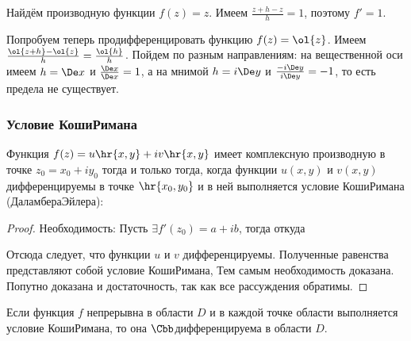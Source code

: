 \documentclass[a4paper]{article}
\begin{document}
\begin{ex}
Найдём производную функции $f(z) = z$. Имеем $\frac{z + h - z}{h} = 1$, поэтому $f' = 1$.
\end{ex}

\begin{ex}
Попробуем теперь продифференцировать функцию $f(z) = \ol{z}$.
Имеем $\frac{\ol{z + h} - \ol{z}}{h} = \frac{\ol{h}}{h}$. Пойдем по разным направлениям:
на вещественной оси имеем $h = \De x$ и $\frac{\De x}{\De x} = 1$, а на мнимой
$h = i\De y$ и $\frac{ - i\De y}{i\De y} = - 1$, то есть предела не существует.
\end{ex}

\subsubsection{Условие Коши\ч Римана}

\begin{theorem}
Функция $f(z) = u\hr{x,y} + iv\hr{x,y}$ имеет комплексную производную в точке $z_0 = x_0 + iy_0$ тогда
и только тогда, когда функции $u(x,y)$ и $v(x,y)$ дифференцируемы в точке $\hr{x_0, y_0}$ и в ней выполняется условие
Коши\ч Римана (Даламбера\ч Эйлера):

\end{theorem}

\begin{proof}
Необходимость: Пусть $\exi f'(z_0 ) = a + i b$, тогда
откуда

Отсюда следует, что функции $u$ и $v$ дифференцируемы. Полученные равенства представляют собой условие Коши\ч Римана, 
Тем самым необходимость доказана. Попутно доказана и достаточность, так как все рассуждения обратимы.
\end{proof}

\begin{theorem}
Если функция $f$ непрерывна в области $D$ и в каждой точке области выполняется условие
Коши\ч Римана, то она $\Cbb$\д дифференцируема в области $D$.
\end{theorem}
\end{document}

